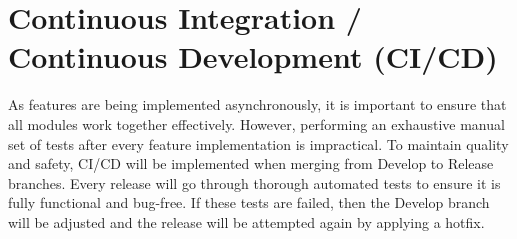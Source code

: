 \section{Continuous Integration / Continuous Development (CI/CD)} \label{section: CI-CD}

As features are being implemented asynchronously, it is important to ensure that all modules work together effectively. However, performing an exhaustive manual set of tests after every feature implementation is impractical. To maintain quality and safety, CI/CD will be implemented when merging from Develop to Release branches. Every release will go through thorough automated tests to ensure it is fully functional and bug-free. If these tests are failed, then the Develop branch will be adjusted and the release will be attempted again by applying a hotfix.
